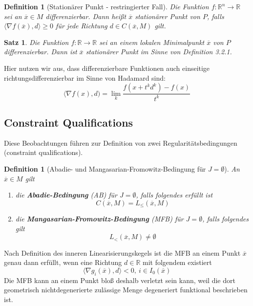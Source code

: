 \documentclass[11pt]{scrreprt}
\newcounter{thm}
\theoremstyle{thmstyle}
\numberwithin{thm}{section}
\newtheorem{definition}[thm]{Definition}
\newtheorem{satz}[thm]{Satz}
\begin{document}
\begin{definition}[Stationärer Punkt - restringierter Fall]
	Die Funktion $f \colon \mathbb{R}^n \rightarrow \mathbb{R}$ sei an $\overline{x} \in M$ differenzierbar. Dann heißt $\overline{x}$ stationärer Punkt von $P$, falls $\langle \nabla f(\overline{x}), d \rangle \geq 0$ für jede Richtung $d \in C(\overline{x}, M)$ gilt.
\end{definition}

\begin{satz}
	Die Funktion $f \colon \mathbb{R} \rightarrow \mathbb{R}$ sei an einem lokalen Minimalpunkt $\overline{x}$ von $P$ differenzierbar. Dann ist $\overline{x}$ stationärer Punkt im Sinne von Definition 3.2.1.	
\end{satz}

Hier nutzen wir aus, dass differenzierbare Funktionen auch einseitige richtungsdifferenzierbar im Sinne von Hadamard sind:
$$ \langle \nabla f(x), d) = \lim_k \frac{f(x + t^k d^k) - f(x)}{t^k} $$

\subsection*{Constraint Qualifications}

Diese Beobachtungen führen zur Definition von zwei Regularitätsbedingungen (constraint qualifications).

\begin{definition}[Abadie- und Mangasarian-Fromowitz-Bedingung für $J = \emptyset$]
	An $\overline{x} \in M$ gilt
	\begin{enumerate}[label=\alph*\upshape)]
		\item die \textbf{Abadie-Bedingung} (AB) für $J = \emptyset$, falls folgendes erfüllt ist
			$$ C(\overline{x}, M) = L_{\leq}(\overline{x}, M) $$
		\item die \textbf{Mangasarian-Fromowitz-Bedingung} (MFB) für $J = \emptyset$, falls folgendes gilt
			$$ L_{<}(\overline{x}, M) \neq \emptyset $$
	\end{enumerate}
\end{definition}

Nach Definition des inneren Linearisierungskegels ist die MFB an einem Punkt $\overline{x}$ genau dann erfüllt, wenn eine Richtung $d \in \mathbb{R}$ mit folgendem existiert
$$ \langle \nabla g_i(\overline{x}), d \rangle < 0, ~i \in I_0(\overline{x}) $$
Die MFB kann an einem Punkt bloß deshalb verletzt sein kann, weil die dort geometrisch nichtdegenerierte zulässige Menge degeneriert funktional beschrieben ist.
\end{document}
